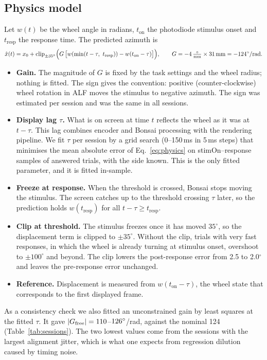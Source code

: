 \documentclass[11pt,a4paper]{article}
\begin{document}
\subsection{Physics model}
Let $w(t)$ be the wheel angle in radians, $t_\mathrm{on}$ the photodiode stimulus onset and $t_\mathrm{resp}$
the response time. The predicted azimuth is
\begin{equation}
\hat x(t) = x_0 + \operatorname{clip}_{\pm35^\circ}\Bigl(G\,\bigl[w(\min(t-\tau,\ t_\mathrm{resp})) - w(t_\mathrm{on}-\tau)\bigr]\Bigr),
\qquad G = -4\,\tfrac{\circ}{\mathrm{mm}}\times 31\,\mathrm{mm} = -124^\circ/\mathrm{rad}.
\label{eq:physics}
\end{equation}
\begin{itemize}
\item \textbf{Gain.} The magnitude of $G$ is fixed by the task settings and the wheel radius; nothing is fitted.
The sign gives the convention: positive (counter-clockwise) wheel rotation in ALF moves the stimulus to
negative azimuth. The sign was estimated per session and was the same in all sessions.
\item \textbf{Display lag $\tau$.} What is on screen at time $t$ reflects the wheel as it was at $t-\tau$. This
lag combines encoder and Bonsai processing with the rendering pipeline. We fit $\tau$ per session by a grid
search (0--150\,ms in 5\,ms steps) that minimises the mean absolute error of Eq.~\ref{eq:physics} on
stimOn--response samples of answered trials, with the side known. This is the only fitted parameter, and it is
fitted in-sample.
\item \textbf{Freeze at response.} When the threshold is crossed, Bonsai stops moving the stimulus. The screen
catches up to the threshold crossing $\tau$ later, so the prediction holds $w(t_\mathrm{resp})$ for all
$t-\tau\ge t_\mathrm{resp}$.
\item \textbf{Clip at threshold.} The stimulus freezes once it has moved $35^\circ$, so the displacement term
is clipped to $\pm35^\circ$. Without the clip, trials with very fast responses, in which the wheel is already
turning at stimulus onset, overshoot to $\pm100^\circ$ and beyond. The clip lowers the post-response error from
2.5 to 2.0$^\circ$ and leaves the pre-response error unchanged.
\item \textbf{Reference.} Displacement is measured from $w(t_\mathrm{on}-\tau)$, the wheel state that
corresponds to the first displayed frame.
\end{itemize}
As a consistency check we also fitted an unconstrained gain by least squares at the fitted $\tau$. It gave
$|G_\mathrm{free}| = 110$--$126^\circ$/rad, against the nominal 124 (Table~\ref{tab:sessions}). The
two lowest values come from the sessions with the largest alignment jitter, which is what one expects from
regression dilution caused by timing noise.
\end{document}
